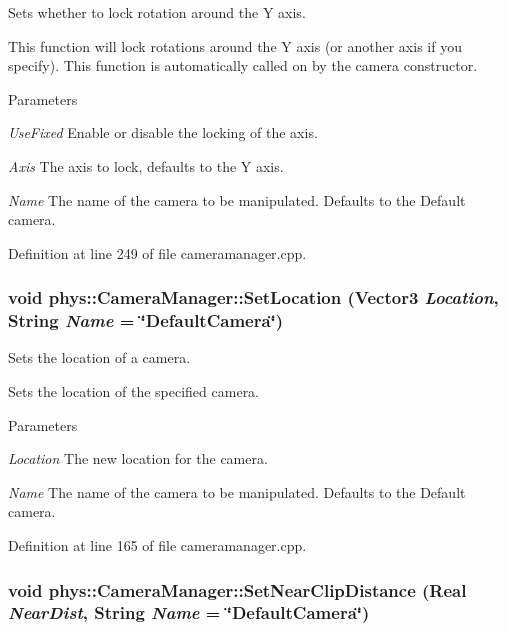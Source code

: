 Sets whether to lock rotation around the Y axis. 

This function will lock rotations around the Y axis (or another axis if you specify). This function is automatically called on by the camera constructor. 
\begin{DoxyParams}{Parameters}
\item[{\em UseFixed}]Enable or disable the locking of the axis. \item[{\em Axis}]The axis to lock, defaults to the Y axis. \item[{\em Name}]The name of the camera to be manipulated. Defaults to the Default camera. \end{DoxyParams}


Definition at line 249 of file cameramanager.cpp.

\hypertarget{classphys_1_1CameraManager_a3f1b48057ca2c1cd79f3e61c9fcbe1b4}{
\subsubsection[{SetLocation}]{\setlength{\rightskip}{0pt plus 5cm}void phys::CameraManager::SetLocation ({\bf Vector3} {\em Location}, \/  {\bf String} {\em Name} = {\ttfamily \char`\"{}DefaultCamera\char`\"{}})}}
\label{d9/d91/classphys_1_1CameraManager_a3f1b48057ca2c1cd79f3e61c9fcbe1b4}


Sets the location of a camera. 

Sets the location of the specified camera. 
\begin{DoxyParams}{Parameters}
\item[{\em Location}]The new location for the camera. \item[{\em Name}]The name of the camera to be manipulated. Defaults to the Default camera. \end{DoxyParams}


Definition at line 165 of file cameramanager.cpp.

\hypertarget{classphys_1_1CameraManager_ad639c275a2bb1c6c05a8800f8e8412c6}{
\subsubsection[{SetNearClipDistance}]{\setlength{\rightskip}{0pt plus 5cm}void phys::CameraManager::SetNearClipDistance ({\bf Real} {\em NearDist}, \/  {\bf String} {\em Name} = {\ttfamily \char`\"{}DefaultCamera\char`\"{}})}}
\label{d9/d91/classphys_1_1CameraManager_ad639c275a2bb1c6c05a8800f8e8412c6}


